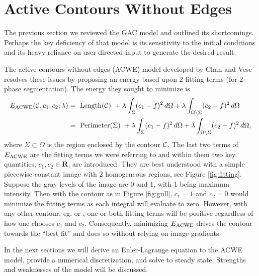 \chapter{Active Contours Without Edges}
\label{ch:acwe}
The previous section we reviewed the GAC model and outlined its shortcomings. Perhaps the key deficiency of that model is its sensitivity to the initial conditions and its heavy reliance on user directed input to generate the desired result. 

The active contours without edges (ACWE) model developed by Chan and Vese \cite{chan2001active} resolves these issues by proposing an energy based upon 2 fitting terms (for 2-phase segmentation). The energy they sought to minimize is 
\begin{align}
\begin{split} 
E_\textrm{ACWE}(\mathcal{C}, c_1, c_2; \lambda)
&= \textrm{ Length($\mathcal{C}$) } 
+ \lambda \int_{\Sigma} (c_1 - f )^2 \,d\Omega
+ \lambda \int_{\Omega \setminus \Sigma} (c_2 - f )^2 \,d\Omega
\\
&= \textrm{ Perimeter($\Sigma$) } 
+ \lambda \int_{\Sigma} (c_1 - f )^2 \,d\Omega
+ \lambda \int_{\Omega \setminus \Sigma} (c_2 - f )^2 \,d\Omega,
\end{split}
\label{eq:acwe_e}
\end{align}
where $\Sigma \subset \Omega$ is the region enclosed by the contour $\mathcal{C}$.
The last two terms of $E_\textrm{ACWE}$ are the fitting terms we were referring to and within them two key quantities, $c_1, c_2 \in \mathbf{R}$, are introduced. They are best understood with a simple piecewise constant image with 2 homogeneous regions, see Figure \ref{fig:fitting}. Suppose the gray levels of the image are 0 and 1, with 1 being maximum intensity. Then with the contour as in Figure \ref{fig:gull}, $c_1 = 1$ and $c_2 = 0$ would minimize the fitting terms as each integral will evaluate to zero. However, with any other contour, eg.  or , one or both fitting terms will be positive regardless of how one chooses $c_1$ and $c_2$. Consequently, minimizing $E_\textrm{ACWE}$ drives the contour towards the ``best fit'' and does so without relying on image gradients.

In the next sections we will derive an Euler-Lagrange equation to the ACWE model, provide a numerical discretization, and solve to steady state. Strengths and weaknesses of the model will be discussed.

